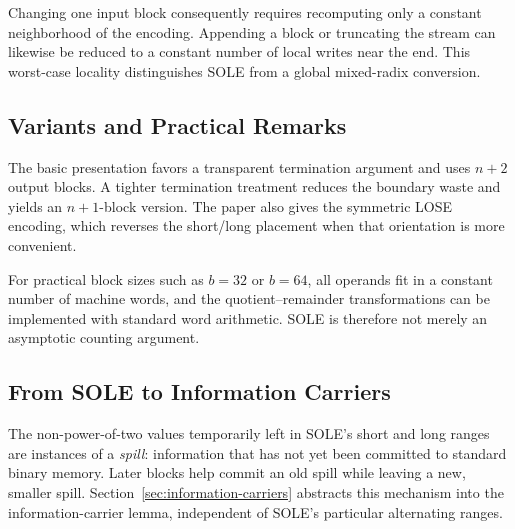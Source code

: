 Changing one input block consequently requires recomputing only a constant
neighborhood of the encoding. Appending a block or truncating the stream can
likewise be reduced to a constant number of local writes near the end. This
worst-case locality distinguishes SOLE from a global mixed-radix conversion.

\subsection{Variants and Practical Remarks}

The basic presentation favors a transparent termination argument and uses
\(n+2\) output blocks. A tighter termination treatment reduces the boundary
waste and yields an \(n+1\)-block version. The paper also gives the symmetric
LOSE encoding, which reverses the short/long placement when that orientation
is more convenient.

For practical block sizes such as \(b=32\) or \(b=64\), all operands fit in a
constant number of machine words, and the quotient--remainder transformations
can be implemented with standard word arithmetic. SOLE is therefore not
merely an asymptotic counting argument.

\subsection{From SOLE to Information Carriers}

The non-power-of-two values temporarily left in SOLE's short and long ranges
are instances of a \emph{spill}: information that has not yet been committed
to standard binary memory. Later blocks help commit an old spill while
leaving a new, smaller spill. Section~\ref{sec:information-carriers} abstracts
this mechanism into the information-carrier lemma, independent of SOLE's
particular alternating ranges.
